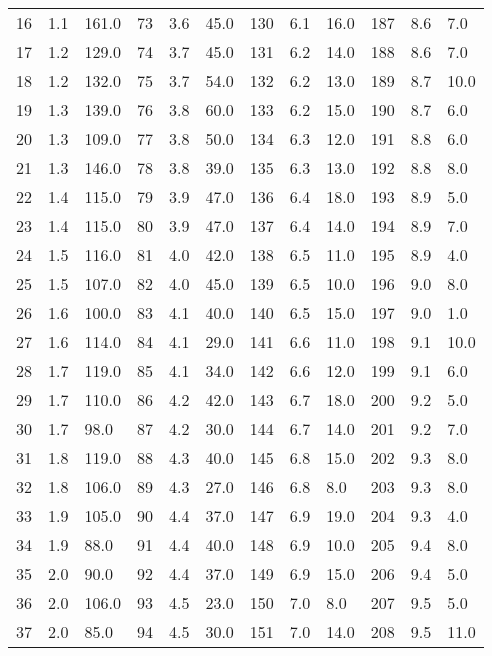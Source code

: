 \begin{table}
{\begin{tabular}{@{}lll|lll|lll|lll@{}}
     16 & 1.1 & 161.0 & 73 & 3.6 & 45.0 & 130 & 6.1 & 16.0 & 187 & 8.6 & 7.0  \\ 
     17 & 1.2 & 129.0 & 74 & 3.7 & 45.0 & 131 & 6.2 & 14.0 & 188 & 8.6 & 7.0  \\ 
     18 & 1.2 & 132.0 & 75 & 3.7 & 54.0 & 132 & 6.2 & 13.0 & 189 & 8.7 & 10.0  \\ 
     19 & 1.3 & 139.0 & 76 & 3.8 & 60.0 & 133 & 6.2 & 15.0 & 190 & 8.7 & 6.0  \\ 
     20 & 1.3 & 109.0 & 77 & 3.8 & 50.0 & 134 & 6.3 & 12.0 & 191 & 8.8 & 6.0  \\ 
     21 & 1.3 & 146.0 & 78 & 3.8 & 39.0 & 135 & 6.3 & 13.0 & 192 & 8.8 & 8.0  \\ 
     22 & 1.4 & 115.0 & 79 & 3.9 & 47.0 & 136 & 6.4 & 18.0 & 193 & 8.9 & 5.0  \\ 
     23 & 1.4 & 115.0 & 80 & 3.9 & 47.0 & 137 & 6.4 & 14.0 & 194 & 8.9 & 7.0  \\ 
     24 & 1.5 & 116.0 & 81 & 4.0 & 42.0 & 138 & 6.5 & 11.0 & 195 & 8.9 & 4.0  \\ 
     25 & 1.5 & 107.0 & 82 & 4.0 & 45.0 & 139 & 6.5 & 10.0 & 196 & 9.0 & 8.0  \\ 
     26 & 1.6 & 100.0 & 83 & 4.1 & 40.0 & 140 & 6.5 & 15.0 & 197 & 9.0 & 1.0  \\ 
     27 & 1.6 & 114.0 & 84 & 4.1 & 29.0 & 141 & 6.6 & 11.0 & 198 & 9.1 & 10.0  \\ 
     28 & 1.7 & 119.0 & 85 & 4.1 & 34.0 & 142 & 6.6 & 12.0 & 199 & 9.1 & 6.0  \\ 
     29 & 1.7 & 110.0 & 86 & 4.2 & 42.0 & 143 & 6.7 & 18.0 & 200 & 9.2 & 5.0  \\ 
     30 & 1.7 & 98.0 & 87 & 4.2 & 30.0 & 144 & 6.7 & 14.0 & 201 & 9.2 & 7.0  \\ 
     31 & 1.8 & 119.0 & 88 & 4.3 & 40.0 & 145 & 6.8 & 15.0 & 202 & 9.3 & 8.0  \\ 
     32 & 1.8 & 106.0 & 89 & 4.3 & 27.0 & 146 & 6.8 & 8.0 & 203 & 9.3 & 8.0  \\ 
     33 & 1.9 & 105.0 & 90 & 4.4 & 37.0 & 147 & 6.9 & 19.0 & 204 & 9.3 & 4.0  \\ 
     34 & 1.9 & 88.0 & 91 & 4.4 & 40.0 & 148 & 6.9 & 10.0 & 205 & 9.4 & 8.0  \\ 
     35 & 2.0 & 90.0 & 92 & 4.4 & 37.0 & 149 & 6.9 & 15.0 & 206 & 9.4 & 5.0  \\ 
     36 & 2.0 & 106.0 & 93 & 4.5 & 23.0 & 150 & 7.0 & 8.0 & 207 & 9.5 & 5.0  \\ 
     37 & 2.0 & 85.0 & 94 & 4.5 & 30.0 & 151 & 7.0 & 14.0 & 208 & 9.5 & 11.0  \\ 

\end{tabular}}
\end{table}
